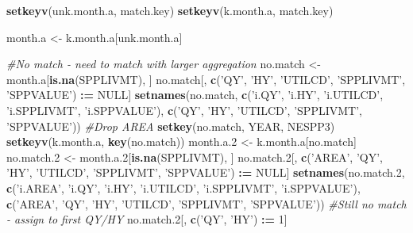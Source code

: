 \documentclass[]{article}
\newenvironment{Shaded}{\begin{snugshade}}{\end{snugshade}}
\newcommand{\KeywordTok}[1]{\textcolor[rgb]{0.13,0.29,0.53}{\textbf{#1}}}
\newcommand{\DecValTok}[1]{\textcolor[rgb]{0.00,0.00,0.81}{#1}}
\newcommand{\StringTok}[1]{\textcolor[rgb]{0.31,0.60,0.02}{#1}}
\newcommand{\CommentTok}[1]{\textcolor[rgb]{0.56,0.35,0.01}{\textit{#1}}}
\newcommand{\OtherTok}[1]{\textcolor[rgb]{0.56,0.35,0.01}{#1}}
\newcommand{\OperatorTok}[1]{\textcolor[rgb]{0.81,0.36,0.00}{\textbf{#1}}}
\newcommand{\ErrorTok}[1]{\textcolor[rgb]{0.64,0.00,0.00}{\textbf{#1}}}
\newcommand{\NormalTok}[1]{#1}
\begin{document}
\begin{Shaded}
\begin{Highlighting}[]
  \KeywordTok{setkeyv}\NormalTok{(unk.month.a, match.key)}
  \KeywordTok{setkeyv}\NormalTok{(k.month.a,   match.key)}
  
\NormalTok{  month.a <-}\StringTok{ }\NormalTok{k.month.a[unk.month.a]}
  
  \CommentTok{#No match - need to match with larger aggregation}
\NormalTok{  no.match  <-}\StringTok{ }\NormalTok{month.a[}\KeywordTok{is.na}\NormalTok{(SPPLIVMT), ]}
\NormalTok{  no.match[, }\KeywordTok{c}\NormalTok{(}\StringTok{'QY'}\NormalTok{, }\StringTok{'HY'}\NormalTok{, }\StringTok{'UTILCD'}\NormalTok{, }\StringTok{'SPPLIVMT'}\NormalTok{, }\StringTok{'SPPVALUE'}\NormalTok{) }\OperatorTok{:}\ErrorTok{=}\StringTok{ }\OtherTok{NULL}\NormalTok{]}
  \KeywordTok{setnames}\NormalTok{(no.match, }\KeywordTok{c}\NormalTok{(}\StringTok{'i.QY'}\NormalTok{, }\StringTok{'i.HY'}\NormalTok{, }\StringTok{'i.UTILCD'}\NormalTok{, }\StringTok{'i.SPPLIVMT'}\NormalTok{, }\StringTok{'i.SPPVALUE'}\NormalTok{), }
           \KeywordTok{c}\NormalTok{(}\StringTok{'QY'}\NormalTok{, }\StringTok{'HY'}\NormalTok{, }\StringTok{'UTILCD'}\NormalTok{, }\StringTok{'SPPLIVMT'}\NormalTok{, }\StringTok{'SPPVALUE'}\NormalTok{))}
  \CommentTok{#Drop AREA}
  \KeywordTok{setkey}\NormalTok{(no.match, YEAR, NESPP3)}
  \KeywordTok{setkeyv}\NormalTok{(k.month.a, }\KeywordTok{key}\NormalTok{(no.match))}
\NormalTok{  month.a.}\DecValTok{2}\NormalTok{ <-}\StringTok{ }\NormalTok{k.month.a[no.match]}
\NormalTok{  no.match.}\DecValTok{2}\NormalTok{ <-}\StringTok{ }\NormalTok{month.a.}\DecValTok{2}\NormalTok{[}\KeywordTok{is.na}\NormalTok{(SPPLIVMT), ]}
\NormalTok{  no.match.}\DecValTok{2}\NormalTok{[, }\KeywordTok{c}\NormalTok{(}\StringTok{'AREA'}\NormalTok{, }\StringTok{'QY'}\NormalTok{, }\StringTok{'HY'}\NormalTok{, }\StringTok{'UTILCD'}\NormalTok{, }\StringTok{'SPPLIVMT'}\NormalTok{, }\StringTok{'SPPVALUE'}\NormalTok{) }\OperatorTok{:}\ErrorTok{=}\StringTok{ }\OtherTok{NULL}\NormalTok{]}
  \KeywordTok{setnames}\NormalTok{(no.match.}\DecValTok{2}\NormalTok{, }\KeywordTok{c}\NormalTok{(}\StringTok{'i.AREA'}\NormalTok{, }\StringTok{'i.QY'}\NormalTok{, }\StringTok{'i.HY'}\NormalTok{, }\StringTok{'i.UTILCD'}\NormalTok{, }\StringTok{'i.SPPLIVMT'}\NormalTok{, }\StringTok{'i.SPPVALUE'}\NormalTok{), }
           \KeywordTok{c}\NormalTok{(}\StringTok{'AREA'}\NormalTok{, }\StringTok{'QY'}\NormalTok{, }\StringTok{'HY'}\NormalTok{, }\StringTok{'UTILCD'}\NormalTok{, }\StringTok{'SPPLIVMT'}\NormalTok{, }\StringTok{'SPPVALUE'}\NormalTok{))}
  \CommentTok{#Still no match - assign to first QY/HY}
\NormalTok{  no.match.}\DecValTok{2}\NormalTok{[, }\KeywordTok{c}\NormalTok{(}\StringTok{'QY'}\NormalTok{, }\StringTok{'HY'}\NormalTok{) }\OperatorTok{:}\ErrorTok{=}\StringTok{ }\DecValTok{1}\NormalTok{]}

\end{Highlighting}
\end{Shaded}
\end{document}
